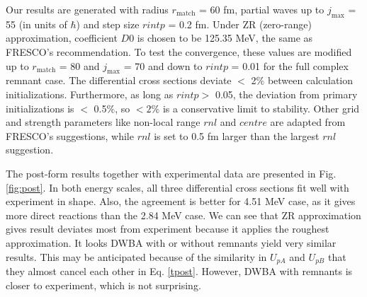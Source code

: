 Our results are generated with radius $r_{\mathrm{match}}$ = 60 fm, partial waves up to $j_{\max}$ = 55 (in units of $\hbar$) and step size $rintp$ = 0.2 fm. 
Under ZR (zero-range) approximation, coefficient $D0$ is chosen to be 125.35 MeV, the same as FRESCO's recommendation. 
To test the convergence, these values are modified up to $r_{\mathrm{match}}$ = 80 and $j_{\max}$ = 70 and down to $rintp$ = 0.01 for the full complex remnant case.
 The differential cross sections deviate $<$ 2$\%$  between calculation initializations. 
 Furthermore, as long as $rintp >$ 0.05, the deviation from primary initializations is $<$ 0.5$\%$, so $< 2\%$ is a conservative limit to stability. 
 Other grid and strength parameters like non-local range $rnl$ and $centre$ are adapted from FRESCO's suggestions,
while $rnl$ is set to 0.5 fm larger than the largest $rnl$ suggestion.

The post-form results together with experimental data \cite{PhysRev.101.209} are presented in Fig. \ref{fig:post}.
In both energy scales, all three differential cross sections fit well with experiment in shape. 
Also, the agreement is better for 4.51 MeV case, as it gives more direct reactions than the 2.84 MeV case.
We can see that ZR approximation gives result deviates most from experiment because it applies the roughest approximation.
It looks DWBA with or without remnants yield very similar results.
This may be anticipated because of the similarity in $U_{pA}$ and $U_{pB}$ that they almost cancel each other in Eq. \ref{tpost}.
However, DWBA with remnants is closer to experiment, which is not surprising. 